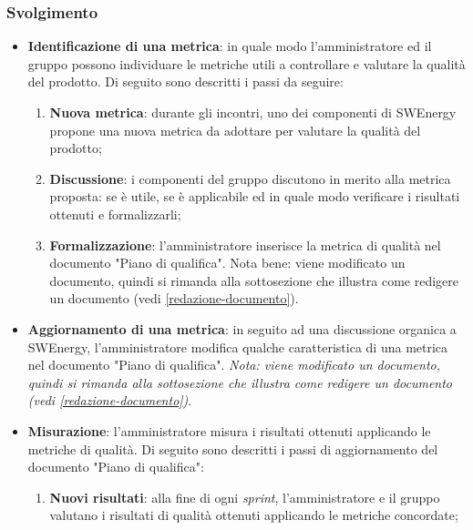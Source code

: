 \subsubsection{Svolgimento}
\begin{itemize}
	\item \textbf{Identificazione di una metrica}: in quale modo
	      l'amministratore ed il gruppo possono individuare le metriche utili a
	      controllare e valutare la qualità del prodotto. Di seguito sono
	      descritti i passi da seguire:
	      \begin{enumerate}
		      \item \textbf{Nuova metrica}: durante gli incontri, uno dei
		            componenti di SWEnergy propone una nuova metrica da adottare
		            per valutare la qualità del prodotto;

		      \item \textbf{Discussione}: i componenti del gruppo discutono in
		            merito alla metrica proposta: se è utile, se è applicabile
		            ed in quale modo verificare i risultati ottenuti e
		            formalizzarli;

		      \item \textbf{Formalizzazione}: l'amministratore inserisce la
		            metrica di qualità nel documento "Piano di qualifica". Nota
		            bene: viene modificato un documento, quindi si rimanda alla
		            sottosezione che illustra come redigere un documento
		            (vedi \cref{redazione-documento}).
	      \end{enumerate}

	\item \textbf{Aggiornamento di una metrica}: in seguito ad una discussione
	      organica a SWEnergy, l'amministratore modifica qualche caratteristica
	      di una metrica nel documento "Piano di qualifica". \textit{Nota:
	      viene modificato un documento, quindi si rimanda alla
	      sottosezione che illustra come redigere un documento
	      (vedi \cref{redazione-documento})}.

	\item \textbf{Misurazione}: l'amministratore misura i risultati ottenuti
	      applicando le metriche di qualità. Di seguito sono descritti i passi
	      di aggiornamento del documento "Piano di qualifica":
	      \begin{enumerate}
		      \item \textbf{Nuovi risultati}: alla fine di ogni \textit{sprint},
		            l'amministratore e il gruppo valutano i risultati di qualità
		            ottenuti applicando le metriche concordate;


\end{enumerate}
\end{itemize}

